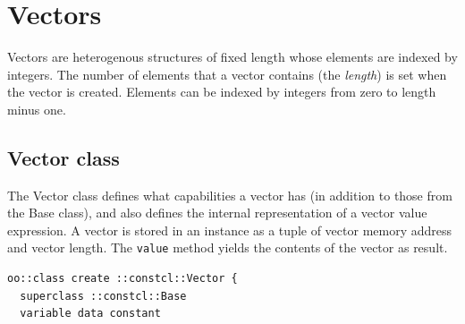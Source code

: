 \documentclass[twoside]{report}
\begin{document}
\section{Vectors}
\label{vectors}

Vectors are heterogenous structures of fixed length whose elements are indexed by integers. The number of elements that a vector contains (the \emph{length}) is set when the vector is created. Elements can be indexed by integers from zero to length minus one.

\subsection{Vector class}
\label{vector-class}

The Vector class defines what capabilities a vector has (in addition to those from the Base class), and also defines the internal representation of a vector value expression. A vector is stored in an instance as a tuple of vector memory address and vector length. The \texttt{value} method yields the contents of the vector as result.

\begin{lstlisting}
oo::class create ::constcl::Vector {
  superclass ::constcl::Base
  variable data constant
\end{lstlisting}
\end{document}
